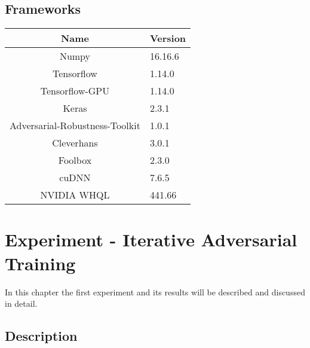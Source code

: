\documentclass[draft,final]{vutinfth} %
\begin{document}
\section{Frameworks}

\begin{table}[h]
  \centering
  \begin{tabular}{cl}
    \toprule
		Name                                & Version   \\
    \midrule
    Numpy                               & 16.16.6	  \\
    Tensorflow                          & 1.14.0    \\
    Tensorflow-GPU                      & 1.14.0    \\
    Keras                               & 2.3.1     \\
    Adversarial-Robustness-Toolkit      & 1.0.1     \\
    Cleverhans                          & 3.0.1     \\
    Foolbox                             & 2.3.0     \\
		cuDNN																&	7.6.5			\\
		NVIDIA WHQL													& 441.66		\\
		
    
    \bottomrule
  \end{tabular}
\end{table}


\chapter{Experiment - Iterative Adversarial Training}
In this chapter the first experiment and its results will be described and discussed in detail.

\section{Description}
\end{document}
